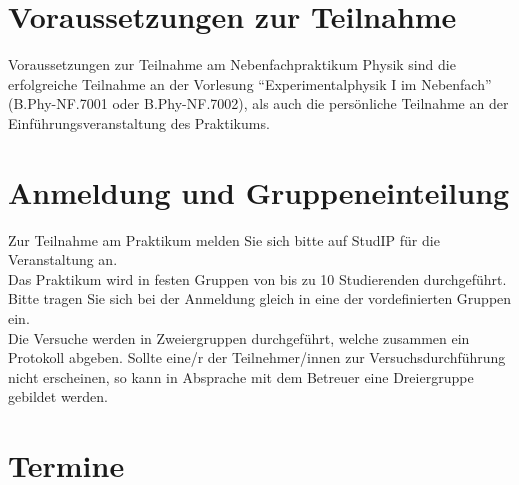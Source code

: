 



\section{Voraussetzungen zur Teilnahme}

Voraussetzungen zur Teilnahme am Nebenfachpraktikum Physik sind die erfolgreiche Teilnahme an der Vorlesung "`Experimentalphysik I im Nebenfach"' (B.Phy-NF.7001 oder B.Phy-NF.7002), als auch die persönliche Teilnahme an der Einführungsveranstaltung des Praktikums. 

\section{Anmeldung und Gruppeneinteilung}

Zur Teilnahme am Praktikum melden Sie sich bitte auf StudIP für die Veranstaltung an.\\
Das Praktikum wird in festen Gruppen von bis zu 10 Studierenden durchgeführt. Bitte tragen Sie sich bei der Anmeldung gleich in eine der vordefinierten Gruppen ein.\\
Die Versuche werden in Zweiergruppen durchgeführt, welche zusammen ein Protokoll abgeben. Sollte eine/r der Teilnehmer/innen zur Versuchsdurchführung nicht erscheinen, so kann in Absprache mit dem Betreuer eine Dreiergruppe gebildet werden.

\section{Termine}

